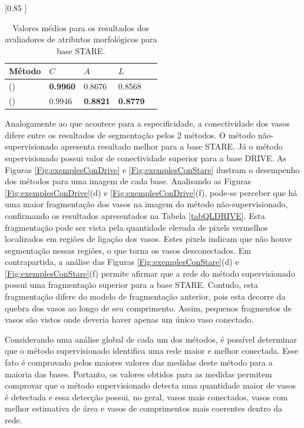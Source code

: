 \begin{table}[h!]
  \caption{Valores m\'{e}dios para os resultados dos avaliadores de atributos morfol\'{o}gicos para base STARE.}
  \label{tabQLSTARE}
  \centering
  [0.85 ]{ 
    \begin{tabular}{lllll}
      \toprule
      M\'{e}todo & $C$ & $A$ & $L$ \\
      \midrule                 
      \citeauthor{Zana:2001} (\citeyear{Zana:2001})  &\textbf{0.9960} &0.8676 &0.8568 \\

      \citeauthor{Soares:2006} (\citeyear{Soares:2006}) &0.9946 &\textbf{0.8821} &\textbf{0.8779} \\
      \bottomrule
    \end{tabular}
  }
\end{table}

Analogamente ao que acontece para a especificidade, a conectividade dos vasos difere entre os resultados de segmenta\c{c}\~{a}o pelos 2 m\'{e}todos. O m\'{e}todo n\~{a}o-supervisionado apresenta resultado melhor para a base STARE. J\'{a} o m\'{e}todo supervisionado possui valor de conectividade superior para a base DRIVE. As Figuras \ref{Fig:exemplesConDrive} e \ref{Fig:exemplesConStare} ilustram o desempenho dos m\'{e}todos para uma imagem de cada base. Analisando as Figuras \ref{Fig:exemplesConDrive}(d) e \ref{Fig:exemplesConDrive}(f), pode-se perceber que h\'{a} uma maior fragmenta\c{c}\~{a}o dos vasos na imagem do m\'{e}todo n\~{a}o-supervisionado, confirmando os resultados apresentados na Tabela \ref{tabQLDRIVE}. Esta fragmenta\c{c}\~{a}o pode ser vista pela quantidade elevada de pixels vermelhos localizados em regi\~{o}es de liga\c{c}\~{a}o dos vasos. Estes pixels indicam que n\~{a}o houve segmenta\c{c}\~{a}o nessas regi\~{o}es, o que torna os vasos desconectados. Em contrapartida, a an\'{a}lise das Figuras \ref{Fig:exemplesConStare}(d) e \ref{Fig:exemplesConStare}(f) permite afirmar que a rede do m\'{e}todo supervisionado possui uma fragmenta\c{c}\~{a}o superior para a base STARE. Contudo, esta fragmenta\c{c}\~{a}o difere do modelo de fragmenta\c{c}\~{a}o anterior, pois esta decorre da quebra dos vasos ao longo de seu comprimento. Assim, pequenos fragmentos de vasos s\~{a}o vistos onde deveria haver apenas um \'{u}nico vaso conectado. 

Considerando uma an\'{a}lise global de cada um dos m\'{e}todos, \'{e} poss\'{i}vel determinar que o m\'{e}todo supervisionado identifica uma rede maior e melhor conectada. Esse fato \'{e} comprovado pelos maiores valores das medidas deste m\'{e}todo para a maioria das bases. Portanto, os valores obtidos para as medidas permitem comprovar que o m\'{e}todo supervisionado detecta uma quantidade maior de vasos \'{e} detectada e essa detec\c{c}\~{a}o possui, no geral, vasos mais conectados, vasos com melhor estimativa de \'{a}rea e vasos de comprimentos mais coerentes dentro da rede.


